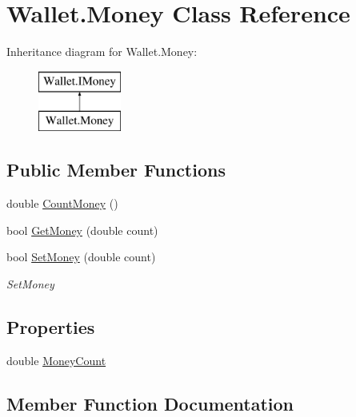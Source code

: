 \hypertarget{class_wallet_1_1_money}{}\section{Wallet.\+Money Class Reference}
\label{class_wallet_1_1_money}
Inheritance diagram for Wallet.\+Money\+:\begin{figure}[H]
\begin{center}
\leavevmode
\includegraphics[height=2.000000cm]{class_wallet_1_1_money}
\end{center}
\end{figure}
\subsection*{Public Member Functions}
\begin{DoxyCompactItemize}
\item 
double \hyperlink{class_wallet_1_1_money_acc17708e69b93b545c37e0f4c367ebe4}{Count\+Money} ()
\item 
bool \hyperlink{class_wallet_1_1_money_a6a66f552f42767fce97bd0945d91cd6b}{Get\+Money} (double count)
\item 
bool \hyperlink{class_wallet_1_1_money_a5a37d3aa171327b361f985964dc44534}{Set\+Money} (double count)
\begin{DoxyCompactList}\small\item\em Set\+Money \end{DoxyCompactList}\end{DoxyCompactItemize}
\subsection*{Properties}
\begin{DoxyCompactItemize}
\item 
double \hyperlink{class_wallet_1_1_money_ae34a6f4e26bbd7b3ff5fdf88f1c0c83f}{Money\+Count}
\end{DoxyCompactItemize}


\subsection{Member Function Documentation}
\hypertarget{class_wallet_1_1_money_acc17708e69b93b545c37e0f4c367ebe4}{}\label{class_wallet_1_1_money_acc17708e69b93b545c37e0f4c367ebe4} 
